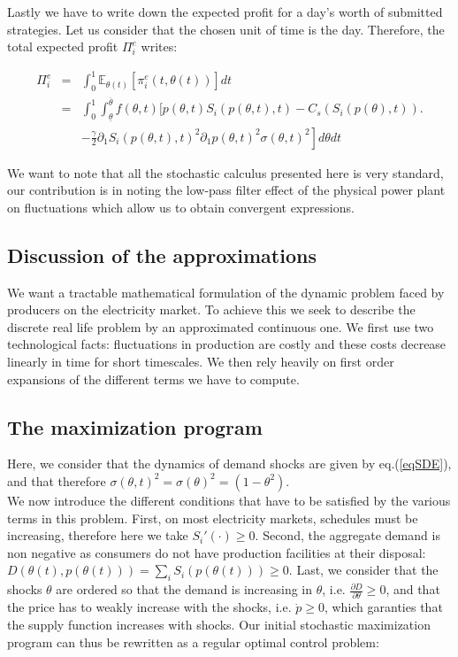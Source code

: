 Lastly we have to write down the expected profit for a day's worth of submitted strategies. Let us consider that the chosen unit of time is the day. Therefore, the total expected profit $\Pi^e_i$ writes: 

\begin{eqnarray}
\Pi^e_i&=&\int_0^1\mathbb{E}_{\theta(t)}[\pi^e_i(t,\theta(t))]dt\nonumber\\
&=&\int_0^1\int_{\underline{\theta}}^{\overline{\theta}}f(\theta,t)\Big[p(\theta,t)S_i(p(\theta,t),t) - C_s(S_i(p(\theta),t)) \Big.\nonumber\\
&&\left.-\frac{\gamma}{2} \partial_1S_i(p(\theta,t),t)^2\partial_1p(\theta,t)^2 \sigma(\theta,t)^2\right]d\theta dt
\label{totprofit}
\end{eqnarray}

We want to note that all the stochastic calculus presented here is very standard, our contribution is in noting the low-pass filter effect of the physical power plant on fluctuations which allow us to obtain convergent expressions.

\subsection{Discussion of the approximations}
We want a tractable mathematical formulation of the dynamic problem faced by producers on the electricity market. To achieve this we seek to describe the discrete real life problem by an approximated continuous one. We first use two technological facts: fluctuations in production are costly and these costs decrease linearly in time for short timescales. We then rely heavily on first order expansions of the different terms we have to compute.  

\subsection{The maximization program}
Here, we consider that the dynamics of demand shocks are given by eq.(\ref{eqSDE}), and that therefore  $\sigma(\theta,t)^2=\sigma(\theta)^2=(1-\theta^2)$.\\

We now introduce the different conditions that have to be satisfied by the various terms in this problem. First, on most electricity markets, schedules must be increasing, therefore here we take $S_i'(\cdot)\geq0$. Second, the aggregate demand is non negative as consumers do not have production facilities at their disposal: $D(\theta(t),p(\theta(t)))=\sum_iS_i(p(\theta(t)))\geq0$. Last, we consider that the shocks $\theta$ are ordered so that the demand is increasing in $\theta$, i.e. $\frac{\partial D}{\partial\theta}\geq0$, and that the price has to weakly increase with the shocks, i.e. $\dot{p}\geq0$, which garanties that the supply function increases with shocks. Our initial stochastic maximization program can thus be rewritten as a regular optimal control problem: 

